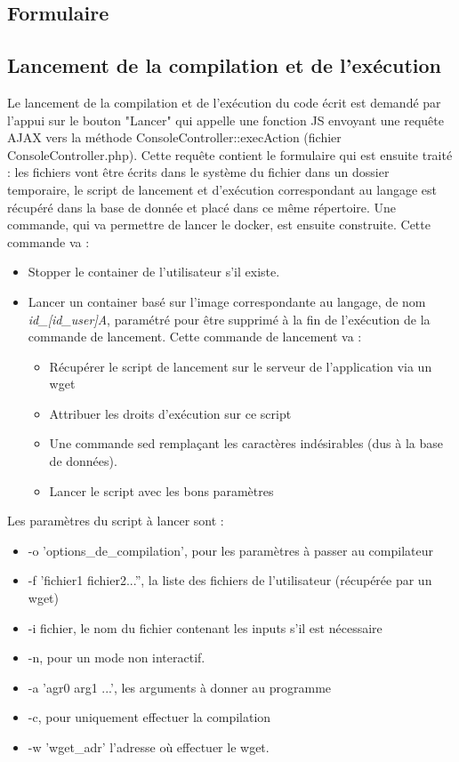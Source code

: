 \subsection{Formulaire}


\subsection{Lancement de la compilation et de l'exécution}

Le lancement de la compilation et de l'exécution du code écrit est demandé par l'appui sur le bouton "Lancer" qui appelle une fonction JS envoyant une requête AJAX
vers la méthode ConsoleController::execAction (fichier ConsoleController.php). Cette requête contient le formulaire qui est ensuite traité : les fichiers vont être écrits dans
le système du fichier dans un dossier temporaire, le script de lancement et d'exécution correspondant au langage est récupéré dans la base de donnée et placé dans ce même répertoire.
Une commande, qui va permettre de lancer le docker, est ensuite construite. Cette commande va :
\begin{itemize}
  \item Stopper le container de l'utilisateur s'il existe.
  \item{Lancer un container basé sur l'image correspondante au langage, de nom \emph{id\_[id\_user]A}, paramétré pour être supprimé à la fin de l'exécution de la commande de lancement. Cette commande de lancement va :
  \begin{itemize}
    \item Récupérer le script de lancement sur le serveur de l'application via un wget
    \item Attribuer les droits d'exécution sur ce script
    \item Une commande sed remplaçant les caractères indésirables (dus à la base de données).
    \item Lancer le script avec les bons paramètres
  \end{itemize}}
\end{itemize}

Les paramètres du script à lancer sont :
\begin{itemize}
  \item -o 'options\_de\_compilation', pour les paramètres à passer au compilateur
  \item -f 'fichier1 fichier2...'', la liste des fichiers de l'utilisateur (récupérée par un wget)
  \item -i fichier, le nom du fichier contenant les inputs s'il est nécessaire
  \item -n, pour un mode non interactif.
  \item -a 'agr0 arg1 ...', les arguments à donner au programme
  \item -c, pour uniquement effectuer la compilation
  \item -w 'wget\_adr' l'adresse où effectuer le wget.
\end{itemize}

